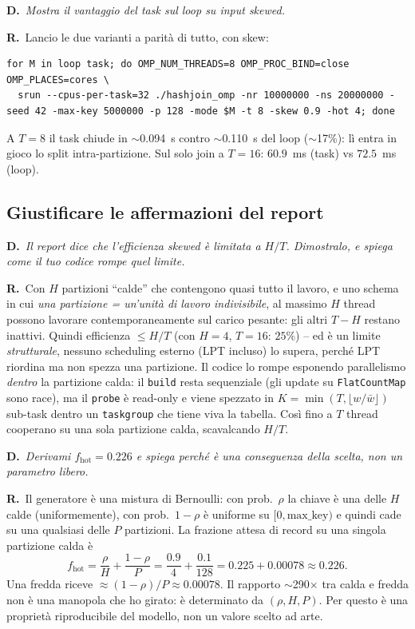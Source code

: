 \documentclass[11pt,a4paper]{article}
\newcommand{\D}[1]{\begin{dom}\small\textbf{D.}\ \itshape #1\end{dom}}
\newcommand{\R}{\noindent\textbf{R.}\ }
\begin{document}
\D{Mostra il vantaggio del task sul loop su input skewed.}
\R Lancio le due varianti a parità di tutto, con skew:
\begin{lstlisting}[style=bash]
for M in loop task; do OMP_NUM_THREADS=8 OMP_PROC_BIND=close OMP_PLACES=cores \
  srun --cpus-per-task=32 ./hashjoin_omp -nr 10000000 -ns 20000000 -seed 42 -max-key 5000000 -p 128 -mode $M -t 8 -skew 0.9 -hot 4; done
\end{lstlisting}
A $T=8$ il task chiude in $\sim$0.094~s contro $\sim$0.110~s del loop ($\sim$17\%): lì entra in gioco lo split intra-partizione. Sul solo join a $T=16$: $60.9$~ms (task) vs $72.5$~ms (loop).

\subsection{Giustificare le affermazioni del report}

\D{Il report dice che l'efficienza skewed è limitata a $H/T$. Dimostralo, e spiega come il tuo codice rompe quel limite.}
\R Con $H$ partizioni ``calde'' che contengono quasi tutto il lavoro, e uno schema in cui \emph{una partizione = un'unità di lavoro indivisibile}, al massimo $H$ thread possono lavorare contemporaneamente sul carico pesante: gli altri $T-H$ restano inattivi. Quindi efficienza $\le H/T$ (con $H=4$, $T=16$: $25\%$) -- ed è un limite \emph{strutturale}, nessuno scheduling esterno (LPT incluso) lo supera, perché LPT riordina ma non spezza una partizione. Il codice lo rompe esponendo parallelismo \emph{dentro} la partizione calda: il \texttt{build} resta sequenziale (gli update su \texttt{FlatCountMap} sono race), ma il \texttt{probe} è read-only e viene spezzato in $K=\min(T,\lfloor w/\bar w\rfloor)$ sub-task dentro un \texttt{taskgroup} che tiene viva la tabella. Così fino a $T$ thread cooperano su una sola partizione calda, scavalcando $H/T$.

\D{Derivami $f_\text{hot}=0.226$ e spiega perché è una conseguenza della scelta, non un parametro libero.}
\R Il generatore è una mistura di Bernoulli: con prob.\ $\rho$ la chiave è una delle $H$ calde (uniformemente), con prob.\ $1-\rho$ è uniforme su $[0,\text{max\_key})$ e quindi cade su una qualsiasi delle $P$ partizioni. La frazione attesa di record su una singola partizione calda è
\[ f_\text{hot} = \frac{\rho}{H} + \frac{1-\rho}{P} = \frac{0.9}{4} + \frac{0.1}{128} = 0.225 + 0.00078 \approx 0.226. \]
Una fredda riceve $\approx (1-\rho)/P \approx 0.00078$. Il rapporto $\sim$290$\times$ tra calda e fredda non è una manopola che ho girato: è determinato da $(\rho,H,P)$. Per questo è una proprietà riproducibile del modello, non un valore scelto ad arte.
\end{document}
